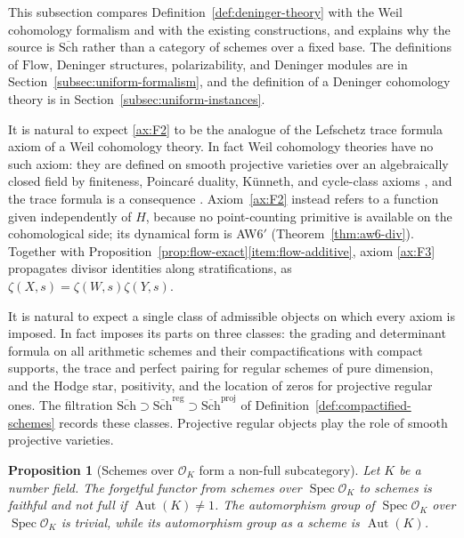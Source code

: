 \documentclass[11pt]{amsart}
\theoremstyle{plain}
\newtheorem{proposition}[theorem]{Proposition}
\theoremstyle{definition}
\theoremstyle{remark}
\numberwithin{equation}{section}
\newcommand{\cO}{\mathcal{O}}
\newcommand{\Schbar}{\overline{\mathrm{Sch}}}
\newcommand{\Flow}{\mathrm{Flow}}
\DeclareMathOperator{\Spec}{Spec}
\begin{document}
This subsection compares Definition~\ref{def:deninger-theory} with
the Weil cohomology formalism and with the existing constructions, and
explains why the source is $\Schbar$ rather than a category of schemes
over a fixed base. The definitions of $\Flow$, Deninger structures,
polarizability, and Deninger modules are in
Section~\ref{subsec:uniform-formalism}, and the definition of a
Deninger cohomology theory is in
Section~\ref{subsec:uniform-instances}.

It is natural to expect \ref{ax:F2} to be the analogue of the
Lefschetz trace formula axiom of a Weil cohomology theory. In fact
Weil cohomology theories have no such axiom: they are defined on smooth
projective varieties over an algebraically closed field by finiteness,
Poincar\'e duality, K\"unneth, and cycle-class axioms
\cite[\S1.2, pp.~362--363]{Kleiman1968Cycles}, and the trace formula
is a consequence \cite[Proposition~1.3.6, p.~366]{Kleiman1968Cycles}.
Axiom~\ref{ax:F2} instead refers to a function given independently of
$H$, because no point-counting primitive is available on the
cohomological side; its dynamical form is AW6$'$
(Theorem~\ref{thm:aw6-div}). Together with
Proposition~\ref{prop:flow-exact}\eqref{item:flow-additive}, axiom
\ref{ax:F3} propagates divisor identities along stratifications, as
$\zeta(X,s)=\zeta(W,s)\zeta(Y,s)$.

It is natural to expect a single class of admissible objects on which
every axiom is imposed. In fact
\cite[Conjecture~2.3, p.~522]{FlachMorin2020DeningerWeilArakelov}
imposes its parts on three classes: the grading and determinant
formula on all arithmetic schemes and their compactifications with
compact supports, the trace and perfect pairing for regular schemes of
pure dimension, and the Hodge star, positivity, and the location of
zeros for projective regular ones. The filtration
$\Schbar\supset\Schbar^{\mathrm{reg}}\supset\Schbar^{\mathrm{proj}}$
of Definition~\ref{def:compactified-schemes} records these classes.
Projective regular objects play the role of smooth projective
varieties.

\begin{proposition}[Schemes over $\cO_K$ form a non-full subcategory]
\label{prop:slice-not-full}
Let $K$ be a number field. The forgetful functor from schemes over
$\Spec\cO_K$ to schemes is faithful and not full if
$\operatorname{Aut}(K)\ne1$. The automorphism group of $\Spec\cO_K$
over $\Spec\cO_K$ is trivial, while its automorphism group as a
scheme is $\operatorname{Aut}(K)$.
\end{proposition}
\end{document}
